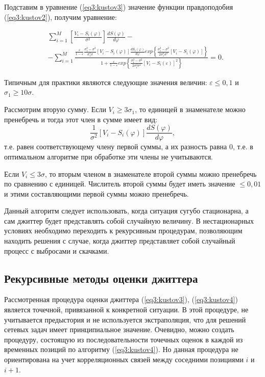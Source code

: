 Подставим в уравнение (\ref{eq3:kustov3}) значение функции правдоподобия (\ref{eq3:kustov2}), получим уравнение:

\begin{equation}\label{eq3:kustov4}
\begin{split}
&\sum_{i=1}^M\left[\frac{V_i-S_i(\varphi)}{\sigma^2}\right]\frac{dS(\varphi)}{d\varphi}-\\
&-\sum_{i=1}^M\frac{\frac{\varepsilon}{1-\varepsilon}\frac{\sigma_1^2-\sigma^2}{\sigma_1^3\sigma}[V_i-S_i(\varphi)]\frac{dS_i(\varphi)}{d\varphi}exp\left\{\frac{\sigma_1^2-\sigma^2}{2\sigma_1^2\sigma^2}[V_i-S_i(\varphi)]\right\}}{1+\frac{\varepsilon}{1-\varepsilon}exp\left\{\frac{\sigma_1^2-\sigma^2}{2\sigma_1^2\sigma^2}[V_i-S_i(\varepsilon)]^2\right\}}=0.
\end{split}
\end{equation}

Типичным для практики являются следующие значения величин: $\varepsilon\leq0,1$ и $\sigma_1\geq10\sigma$.

Рассмотрим вторую сумму. Если $V_i\geq3\sigma_1$, то единицей в знаменателе можно пренебречь и тогда этот член в сумме имеет вид:
\begin{equation}\label{eq3:kustov5}
\frac{1}{\sigma^2}[V_i-S_i(\varphi)]\frac{dS(\varphi)}{d\varphi},
\end{equation}
\noindent т.е. равен соответствующему члену первой суммы, а их разность равна 0, т.е. в оптимальном алгоритме при обработке эти члены не учитываются.

Если $V_i\leq3\sigma$, то вторым членом в знаменателе второй суммы можно пренебречь по сравнению с единицей. Числитель второй суммы будет иметь значение $\leq0,01$ и этими составляющими первой суммы можно пренебречь.

Данный алгоритм следует использовать, когда ситуация сугубо стационарна, а сам джиттер будет представлять собой случайную величину.
В нестационарных условиях необходимо переходить к рекурсивным процедурам, позволяющим находить решения с случае, когда джиттер представляет собой случайный процесс с выбросами и скачками.

\subsection{Рекурсивные методы оценки джиттера}

Рассмотренная процедура оценки джиттера (\ref{eq3:kustov3}), (\ref{eq3:kustov4}) является точечной, привязанной к конкретной ситуации. В этой процедуре, не учитывается предыстория и не используется экстраполяция, что для решений сетевых задач имеет принципиальное значение. 
Очевидно, можно создать процедуру, состоящую из последовательности точечных оценок в каждой из временных позиций по алгоритму (\ref{eq3:kustov4}).
Но данная процедура не ориентирована на учет корреляционных связей между соседними позициями $i$ и $i+1$.

